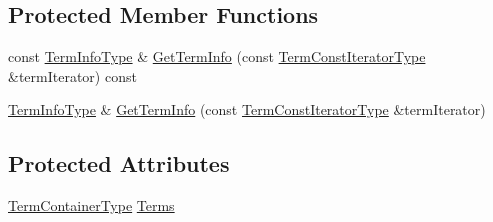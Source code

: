 \subsection*{Protected Member Functions}
\begin{DoxyCompactItemize}
\item 
const \hyperlink{classnmr_polynomial_container_acc456652a77699f540082b3f285ac460}{Term\-Info\-Type} \& \hyperlink{classnmr_polynomial_container_a9c29b5a6752e6aa94975a230e4ac6948}{Get\-Term\-Info} (const \hyperlink{classnmr_polynomial_container_aba8d31506ab6a487fdc4fe2815469442}{Term\-Const\-Iterator\-Type} \&term\-Iterator) const 
\item 
\hyperlink{classnmr_polynomial_container_acc456652a77699f540082b3f285ac460}{Term\-Info\-Type} \& \hyperlink{classnmr_polynomial_container_a0f2ab228be1631eccf5b23122308289e}{Get\-Term\-Info} (const \hyperlink{classnmr_polynomial_container_aba8d31506ab6a487fdc4fe2815469442}{Term\-Const\-Iterator\-Type} \&term\-Iterator)
\end{DoxyCompactItemize}
\subsection*{Protected Attributes}
\begin{DoxyCompactItemize}
\item 
\hyperlink{classnmr_polynomial_container_ae9ba96ffe1b50f1cd84e6728c3a77128}{Term\-Container\-Type} \hyperlink{classnmr_polynomial_container_a70c5e0c98f3a13222bb51bf855e6988a}{Terms}
\end{DoxyCompactItemize}


